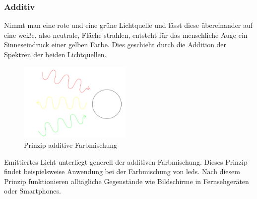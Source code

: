 \documentclass[11pt]{scrartcl}
\begin{document}
\subsubsection{Additiv}
Nimmt man eine rote und eine grüne Lichtquelle und lässt diese übereinander auf eine weiße, also neutrale, Fläche strahlen, entsteht für das menschliche Auge
ein Sinneseindruck einer gelben Farbe. Dies geschieht durch die Addition der Spektren der beiden Lichtquellen.
\cite[62]{lichtquellen}\\
\begin{figure}
    \vspace{-25pt}
    \begin{center}
        \includegraphics[width=0.48\textwidth]{images/additive_color_mixing.png}
    \end{center}
    \vspace{-20pt}
    \caption{Prinzip additive Farbmischung}
    \vspace{-15pt}
\end{figure}
Emittiertes Licht unterliegt generell der additiven Farbmischung. Dieses Prinzip findet beispielsweise Anwendung bei der Farbmischung von \ac{led}s.
Nach diesem Prinzip funktionieren alltägliche Gegenstände wie Bildschirme in Fernsehgeräten oder Smartphones.
\end{document}
